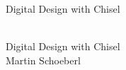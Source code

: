 \documentclass[%
    10pt,
    headinclude, footexclude,
    openright, %
    notitlepage,
    cleardoubleempty,
    headsepline,
    pointlessnumbers,
    bibtotoc, idxtotoc,
    ]{scrbook}
\newif\ifbook
\begin{document}
\ifbook
\else

\newpage
\thispagestyle{empty}
~
\newpage
\fi



\begin{flushleft}
\pagestyle{empty}
\ \\
\vspace{1cm}
{\mdseries\huge Digital Design with Chisel}
\cleardoublepage
\end{flushleft}
\newpage


\begin{flushleft}
\pagestyle{empty}
\ \\
\vspace{1cm}
{\Huge Digital Design with Chisel\\
\bigskip
\bigskip
\bigskip
\bigskip
\bigskip
\bigskip
{\huge Martin Schoeberl}
\medskip\\

}

\newpage
\end{flushleft}
\end{document}
